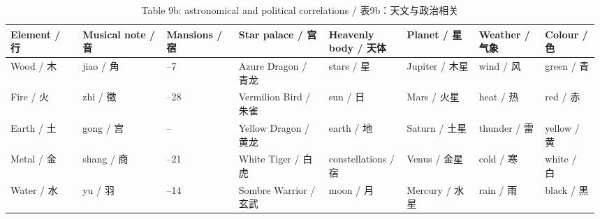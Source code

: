\documentclass[UTF8,zihao=-4]{ctexart}
\begin{document}
\begin{longtable}{>{\raggedright\arraybackslash}p{0.12\linewidth}
                  >{\raggedright\arraybackslash}p{0.14\linewidth}
                  >{\raggedright\arraybackslash}p{0.12\linewidth}
                  >{\raggedright\arraybackslash}p{0.15\linewidth}
                  >{\raggedright\arraybackslash}p{0.13\linewidth}
                  >{\raggedright\arraybackslash}p{0.12\linewidth}
                  >{\raggedright\arraybackslash}p{0.11\linewidth}
                  >{\raggedright\arraybackslash}p{0.09\linewidth}}
\caption{Table 9b: astronomical and political correlations / 表9b：天文与政治相关}\\
\toprule
Element / 行 & Musical note / 音 & Mansions / 宿 & Star palace / 宫 & Heavenly body / 天体 & Planet / 星 & Weather / 气象 & Colour / 色\\
\midrule
Wood / 木 & jiao / 角 & 1--7 & Azure Dragon / 青龙 & stars / 星 & Jupiter / 木星 & wind / 风 & green / 青\\
Fire / 火 & zhi / 徵 & 22--28 & Vermilion Bird / 朱雀 & sun / 日 & Mars / 火星 & heat / 热 & red / 赤\\
Earth / 土 & gong / 宫 & -- & Yellow Dragon / 黄龙 & earth / 地 & Saturn / 土星 & thunder / 雷 & yellow / 黄\\
Metal / 金 & shang / 商 & 15--21 & White Tiger / 白虎 & constellations / 宿 & Venus / 金星 & cold / 寒 & white / 白\\
Water / 水 & yu / 羽 & 8--14 & Sombre Warrior / 玄武 & moon / 月 & Mercury / 水星 & rain / 雨 & black / 黑\\
\bottomrule
\end{longtable}
\end{document}
